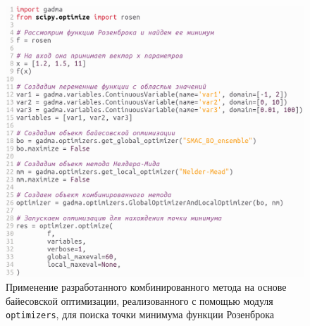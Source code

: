 \begin{figure}[ht]
    \centering
    \includegraphics[width=\linewidth]{images/part2/bayesian_optimization/example_run_bo.png}
    \caption{Применение разработанного комбинированного метода на основе байесовской оптимизации, реализованного с помощью модуля \texttt{optimizers}, для поиска точки минимума функции Розенброка}
    \label{fig:part2:bo_implementation:rosenbrock_ex}
\end{figure}

